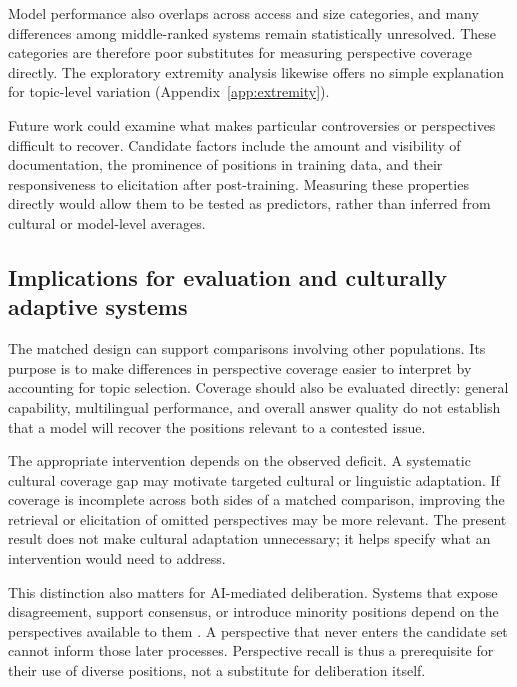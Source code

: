 \documentclass[11pt,a4paper]{article}
\begin{document}
Model performance also overlaps across access and size categories, and many differences among middle-ranked systems remain statistically unresolved. These categories are therefore poor substitutes for measuring perspective coverage directly. The exploratory extremity analysis likewise offers no simple explanation for topic-level variation (Appendix~\ref{app:extremity}).

Future work could examine what makes particular controversies or perspectives difficult to recover. Candidate factors include the amount and visibility of documentation, the prominence of positions in training data, and their responsiveness to elicitation after post-training. Measuring these properties directly would allow them to be tested as predictors, rather than inferred from cultural or model-level averages.

\subsection{Implications for evaluation and culturally adaptive systems}
\label{sec:Implications for evaluation and culturally adaptive systems}
The matched design can support comparisons involving other populations. Its purpose is to make differences in perspective coverage easier to interpret by accounting for topic selection. Coverage should also be evaluated directly: general capability, multilingual performance, and overall answer quality do not establish that a model will recover the positions relevant to a contested issue.

The appropriate intervention depends on the observed deficit. A systematic cultural coverage gap may motivate targeted cultural or linguistic adaptation. If coverage is incomplete across both sides of a matched comparison, improving the retrieval or elicitation of omitted perspectives may be more relevant. The present result does not make cultural adaptation unnecessary; it helps specify what an intervention would need to address.

This distinction also matters for AI-mediated deliberation. Systems that expose disagreement, support consensus, or introduce minority positions depend on the perspectives available to them \cite{tesslerAICanHelp2024a, chiangEnhancingAIAssistedGroup2024b, kimDEBATEDevilsAdvocateBased2024a, leeAmplifyingMinorityVoices2025a}. A perspective that never enters the candidate set cannot inform those later processes. Perspective recall is thus a prerequisite for their use of diverse positions, not a substitute for deliberation itself.
\end{document}
